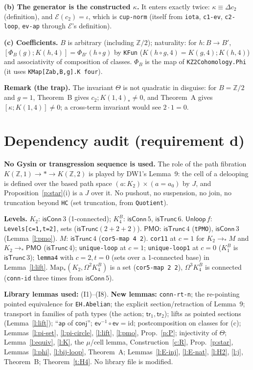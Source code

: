 \documentclass[11pt]{amsart}
\theoremstyle{definition}
\theoremstyle{remark}
\newcommand{\Om}{\Omega}
\newcommand{\Map}{\mathrm{Map}_*}
\newcommand{\Z}{\mathbb{Z}}
\newcommand{\code}[1]{\texttt{#1}}
\newcommand{\cT}{\mathsf{isTrunc}}
\newcommand{\cC}{\mathsf{isConn}}
\newcommand{\ev}{\mathsf{ev}}
\newcommand{\Unl}{\mathsf{Unloop}}
\newcommand{\PMO}{\mathsf{PMO}}
\begin{document}
\noindent\textbf{(b) The generator is the constructed $\kappa$.} It
enters exactly twice: $\kappa\equiv\Delta c_2$ (definition), and
$\mathcal E(c_2)=\iota$, which is \code{cup-norm} (itself from
\code{iota}, \code{c1-ev}, \code{c2-loop}, \code{ev-ap} through
$\mathcal E$'s definition).

\noindent\textbf{(c) Coefficients.} $B$ is arbitrary (including $\Z/2$);
naturality: for $h:B\to B'$, $[\Phi_B(g);K(h,4)]=\Phi_{B'}(h\circ g)$ by
\code{KFun} ($K(h\circ g,4)=K(g,4);K(h,4)$) and associativity of
composition of classes. $\Phi_B$ is the map of \code{KZ2Cohomology.Phi}
(it uses \code{KMap[Zab,B,g].K four}).

\noindent\textbf{Remark (the trap).} The invariant $\Theta$ is not
quadratic in disguise: for $B=\Z/2$ and $g=1$, Theorem~B gives
$c_2;K(1,4)_*\neq0$, and Theorem~A gives $[\kappa;K(1,4)]\neq0$; a cross-term
invariant would see $2\cdot1=0$.

\section{Dependency audit (requirement d)}\label{sec:audit}

\noindent\textbf{No Gysin or transgression sequence is used.} The role of
the path fibration $K(\Z,1)\to *\to K(\Z,2)$ is played by DW1's Lemma~9:
the cell of a delooping is defined over the based path space
$(a:K_2)\times(a=a_0)$ by $J$, and Proposition~\ref{p:star}(i) is a $J$ over
it. No pushout, no suspension, no join, no truncation beyond
\code{HC} (set truncation, from \code{Quotient}).

\noindent\textbf{Levels.} $K_2$: $\cC\,3$ (1-connected); $K^B_4$: $\cC\,5$,
$\cT\,6$. $\Unl\,f$: \code{Levels[c=1,t=2]}, sets ($\cT(2+2+2)$).
$\PMO$: $\cT\,4$ (\code{tPMO}), $\cC\,3$ (Lemma~\ref{l:pmo}). $M$: $\cT\,4$
(\code{cor5-map 4 2}). \code{cor11} at $c=1$ for $K_2\to_*M$ and
$K_2\to_*\PMO$ ($\cT\,4$); \code{unique-loop} at $c=1$; \code{unique-loop1}
at $c=0$ ($K^B_1$ is $\cT\,3$); \code{lemma4} with $c=2,t=0$ (sets over a
1-connected base) in Lemma~\ref{l:lift}. $\Map(K_2,\Om^2K^B_4)$ is a set
(\code{cor5-map 2 2}), $\Om^3K^B_4$ is connected (\code{conn-id} three
times from $\cC\,5$).

\noindent\textbf{Library lemmas used:} (I1)--(I8). \textbf{New lemmas:} \code{conn-rt-n}; the
re-pointing pointed equivalence for \code{EH.Abelian}; the explicit
section/retraction of Lemma~9; transport in families of path types (the
action; $\mathsf{tr}_1,\mathsf{tr}_2$); lifts as pointed sections
(Lemma~\ref{l:lift}); ``$\mathsf{ap}$ of $\mathsf{conj}$'';
$\ev^{-1}\circ\ev=\mathrm{id}$; postcomposition on classes for (c);
Lemmas~\ref{l:pi-set}, \ref{l:pi-circle}, \ref{l:lift}, \ref{l:pmo},
Prop.~\ref{p:P}; injectivity of $\Theta$; Lemma~\ref{l:equiv},
\ref{l:K}, the $\mu$/cell lemma, Construction~\ref{c:R},
Prop.~\ref{p:star}, Lemmas~\ref{l:phi}, \ref{l:bij-loop}, Theorem~A;
Lemmas~\ref{l:E-inj}, \ref{l:E-nat}, \ref{l:H2}, \ref{l:j}, Theorem~B;
Theorem~\ref{t:H4}. No library file is modified.
\end{document}
